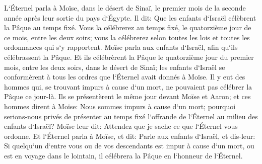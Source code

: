 \verse L`Éternel parla à Moïse, dans le désert de Sinaï, le premier mois de la seconde année après leur sortie du pays d`Égypte. 
\verse Il dit: Que les enfants d`Israël célèbrent la Pâque au temps fixé. 
\verse Vous la célébrerez au temps fixé, le quatorzième jour de ce mois, entre les deux soirs; vous la célébrerez selon toutes les lois et toutes les ordonnances qui s`y rapportent. 
\verse Moïse parla aux enfants d`Israël, afin qu`ils célébrassent la Pâque. 
\verse Et ils célébrèrent la Pâque le quatorzième jour du premier mois, entre les deux soirs, dans le désert de Sinaï; les enfants d`Israël se conformèrent à tous les ordres que l`Éternel avait donnés à Moïse. 
\verse Il y eut des hommes qui, se trouvant impurs à cause d`un mort, ne pouvaient pas célébrer la Pâque ce jour-là. Ils se présentèrent le même jour devant Moïse et Aaron; 
\verse et ces hommes dirent à Moïse: Nous sommes impurs à cause d`un mort; pourquoi serions-nous privés de présenter au temps fixé l`offrande de l`Éternel au milieu des enfants d`Israël? 
\verse Moïse leur dit: Attendez que je sache ce que l`Éternel vous ordonne. 
\verse Et l`Éternel parla à Moïse, et dit: 
\verse Parle aux enfants d`Israël, et dis-leur: Si quelqu`un d`entre vous ou de vos descendants est impur à cause d`un mort, ou est en voyage dans le lointain, il célébrera la Pâque en l`honneur de l`Éternel. 
